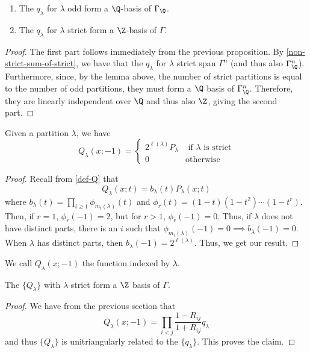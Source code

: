 \documentclass[11pt,leqno,oneside]{amsart}
\numberwithin{thm}{section}
\begin{document}
\begin{prop}
  \begin{enumerate}
  \item The \(q_\lambda\) for \(\lambda\) odd form a \(\Q\)-basis of
    \(\Gamma_\Q\).
  \item The \(q_\lambda\) for \(\lambda\) strict form a \(\Z\)-basis
    of \(\Gamma\).
  \end{enumerate}
\end{prop}
\begin{proof}
  The first part follows immediately from the previous proposition. By
  \ref{non-strict-sum-of-strict}, we have that the \(q_\lambda\) for
  \(\lambda\) strict span \(\Gamma^n\) (and thus also
  \(\Gamma^n_\Q\)). Furthermore, since, by the lemma above, the number
  of strict partitions is equal to the number of odd partitions, they
  must form a \(\Q\) basis of \(\Gamma^n_\Q\). Therefore, they are
  linearly independent over \(\Q\) and thus also \(\Z\), giving the
  second part.
\end{proof}
\begin{prop}
  Given a partition \(\lambda\), we have \[
    Q_\lambda(x;-1) =
    \begin{cases}
      2^{\ell(\lambda)} P_\lambda & \text{ if }\lambda\text{ is
        strict}\\
      0 & \text{otherwise}
    \end{cases}
  \]
\end{prop}
\begin{proof}
  Recall from \ref{def-Q} that \[
    Q_\lambda(x;t) = b_\lambda(t)P_\lambda(x;t)
  \]
  where \(b_\lambda(t) = \prod_{i \geq 1} \phi_{m_i(\lambda)}(t)\) and
  \(\phi_r(t) = (1-t)(1-t^2)\cdots(1-t^r)\). Then, if \(r = 1\),
  \(\phi_r(-1) = 2\), but for \(r > 1\), \(\phi_r(-1)=0\). Thus, if
  \(\lambda\) does not have distinct parts, there is an \(i\) such
  that \(\phi_{m_i(\lambda)}(-1) = 0 \implies b_\lambda(-1) =
  0\). When \(\lambda\) has distinct parts, then \(b_\lambda(-1) =
  2^{\ell(\lambda)}\). Thus, we get our result.
\end{proof}
\begin{defn}
  We call \(Q_\lambda(x;-1)\) the  function indexed by
  \(\lambda\). 
\end{defn}
\begin{prop}
  The \(\{Q_\lambda\}\) with \(\lambda\) strict form a \(\Z\) basis of \(\Gamma\).
\end{prop}
\begin{proof}
  We have from the previous section that \[
    Q_\lambda(x;-1) = \prod_{i < j} \frac{1-R_{ij}}{1+R_{ij}} q_\lambda
  \]
  and thus \(\{Q_\lambda\}\) is unitriangularly related to the
  \(\{q_\lambda\}\). This proves the claim.
\end{proof}
\end{document}
